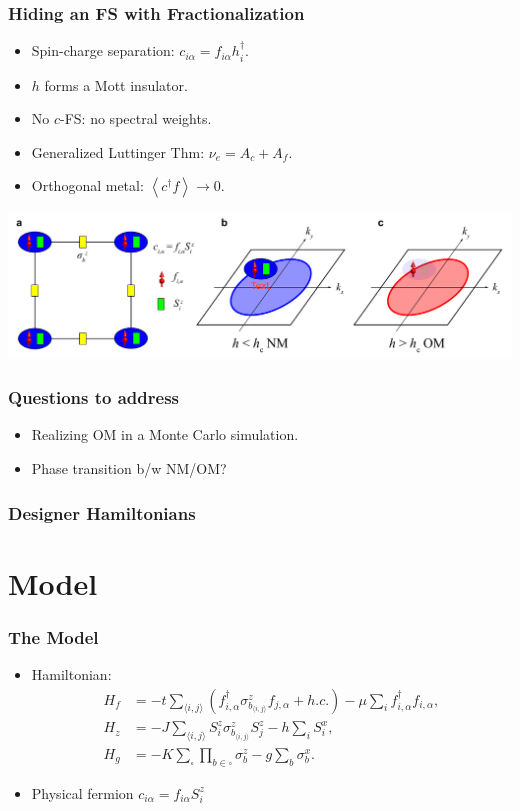 \documentclass[xcolor=table, 10pt, aspectratio=43]{beamer}
\begin{document}
\begin{frame}
  \frametitle{Hiding an FS with Fractionalization}
  \begin{itemize}
    \item Spin-charge separation: $c_{i\alpha} = f_{i\alpha} h_i^\dagger$.
		\item $h$ forms a Mott insulator.
		\item No $c$-FS: no spectral weights.
		\item Generalized Luttinger Thm:
		$\nu_e = A_c + A_f$.
		\item Orthogonal metal: $\left<c^\dagger f\right>\rightarrow 0$.
  \end{itemize}
	\begin{center}
		\includegraphics[width=.8\textwidth]{hide_fs}
	\end{center}
\end{frame}

\begin{frame}
	\frametitle{Questions to address}
	\begin{itemize}
		\item Realizing OM in a Monte Carlo simulation.
		\item Phase transition b/w NM/OM?
	\end{itemize}

\end{frame}

\begin{frame}
\frametitle{Designer Hamiltonians}
\end{frame}

\section{Model}

\begin{frame}
	\frametitle{The Model}
\begin{itemize}
\item Hamiltonian:
	\begin{align*}
	H_f &= -t\sum_{\langle i,j \rangle} (f^{\dagger}_{i,\alpha} \sigma^{z}_{b_{\langle i,j \rangle}}f_{j,\alpha} + h.c.) -\mu\sum_{i}f^{\dagger}_{i,\alpha}f_{i,\alpha}, \nonumber\\
	H_{z} &= -J \sum_{\langle i,j \rangle} S^{z}_{i} \sigma^{z}_{b_{\langle i,j \rangle}} S^{z}_{j} - h \sum_{i} S^{x}_{i}, \nonumber\\
	H_{g} &= -K \sum_{\square}\prod_{b\in\square} \sigma^{z}_{b} - g\sum_{b} \sigma^{x}_{b}.
\end{align*}
\item Physical fermion $c_{i\alpha} = f_{i\alpha}S_i^z$
\end{itemize}
\end{frame}
\end{document}
